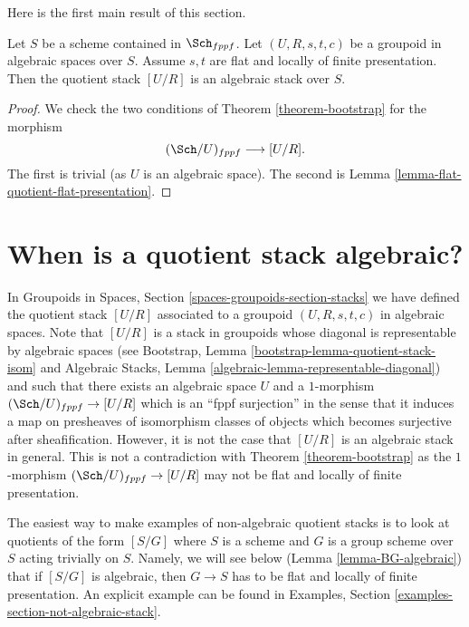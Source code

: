 \noindent
Here is the first main result of this section.

\begin{theorem}
\label{theorem-flat-groupoid-gives-algebraic-stack}
Let $S$ be a scheme contained in $\Sch_{fppf}$.
Let $(U, R, s, t, c)$ be a groupoid in algebraic spaces over $S$.
Assume $s, t$ are flat and locally of finite presentation.
Then the quotient stack $[U/R]$ is an algebraic stack over $S$.
\end{theorem}

\begin{proof}
We check the two conditions of
Theorem \ref{theorem-bootstrap}
for the morphism
$$
(\Sch/U)_{fppf} \longrightarrow [U/R].
$$
The first is trivial (as $U$ is an algebraic space).
The second is
Lemma \ref{lemma-flat-quotient-flat-presentation}.
\end{proof}









\section{When is a quotient stack algebraic?}
\label{section-quotient-algebraic}

\noindent
In
Groupoids in Spaces, Section \ref{spaces-groupoids-section-stacks}
we have defined the quotient stack $[U/R]$ associated to a groupoid
$(U, R, s, t, c)$ in algebraic spaces. Note that $[U/R]$ is a stack
in groupoids whose diagonal is representable by algebraic spaces (see
Bootstrap, Lemma \ref{bootstrap-lemma-quotient-stack-isom}
and
Algebraic Stacks, Lemma \ref{algebraic-lemma-representable-diagonal})
and such that there exists an algebraic space $U$ and a $1$-morphism
$(\Sch/U)_{fppf} \to [U/R]$ which is an ``fppf surjection''
in the sense that it induces a map on presheaves of isomorphism classes of
objects which becomes surjective after sheafification.
However, it is not the case that $[U/R]$ is an algebraic
stack in general. This is not a contradiction with
Theorem \ref{theorem-bootstrap}
as the $1$-morphism $(\Sch/U)_{fppf} \to [U/R]$ may not
be flat and locally of finite presentation.

\medskip\noindent
The easiest way to make examples of non-algebraic quotient stacks is
to look at quotients of the form $[S/G]$ where $S$ is a scheme and $G$
is a group scheme over $S$ acting trivially on $S$. Namely, we will see
below
(Lemma \ref{lemma-BG-algebraic})
that if $[S/G]$ is algebraic, then $G \to S$ has to be flat and locally
of finite presentation. An explicit example can be found in
Examples, Section \ref{examples-section-not-algebraic-stack}.


